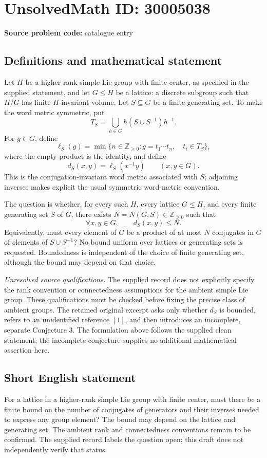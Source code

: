 \documentclass[11pt]{article}
\newcommand{\Z}{\mathbb{Z}}
\begin{document}
\section*{UnsolvedMath ID: 30005038}
\textbf{Source problem code:} catalogue entry
\subsection{Definitions and mathematical statement}
Let \(H\) be a higher-rank simple Lie group with finite center, as specified in the supplied statement, and let \(G\leq H\) be a lattice: a discrete subgroup such that \(H/G\) has finite \(H\)-invariant volume. Let \(S\subseteq G\) be a finite generating set. To make the word metric symmetric, put
\[
T_S=\bigcup_{h\in G}h(S\cup S^{-1})h^{-1}.
\]
For \(g\in G\), define
\[
\ell_S(g)=\min\bigl\{n\in\Z_{\geq 0}:g=t_1\cdots t_n,\quad t_i\in T_S\bigr\},
\]
where the empty product is the identity, and define
\[
d_S(x,y)=\ell_S(x^{-1}y)\qquad(x,y\in G).
\]
This is the conjugation-invariant word metric associated with \(S\); adjoining inverses makes explicit the usual symmetric word-metric convention.

The question is whether, for every such \(H\), every lattice \(G\leq H\), and every finite generating set \(S\) of \(G\), there exists \(N=N(G,S)\in\Z_{\geq 0}\) such that
\[
\forall x,y\in G,\qquad d_S(x,y)\leq N.
\]
Equivalently, must every element of \(G\) be a product of at most \(N\) conjugates in \(G\) of elements of \(S\cup S^{-1}\)? No bound uniform over lattices or generating sets is requested. Boundedness is independent of the choice of finite generating set, although the bound may depend on that choice.

\emph{Unresolved source qualifications.} The supplied record does not explicitly specify the rank convention or connectedness assumptions for the ambient simple Lie group. These qualifications must be checked before fixing the precise class of ambient groups. The retained original excerpt asks only whether \(d_S\) is bounded, refers to an unidentified reference \([1]\), and then introduces an incomplete, separate Conjecture 3. The formulation above follows the supplied clean statement; the incomplete conjecture supplies no additional mathematical assertion here.
\subsection{Short English statement}
For a lattice in a higher-rank simple Lie group with finite center, must there be a finite bound on the number of conjugates of generators and their inverses needed to express any group element? The bound may depend on the lattice and generating set. The ambient rank and connectedness conventions remain to be confirmed. The supplied record labels the question open; this draft does not independently verify that status.
\end{document}
